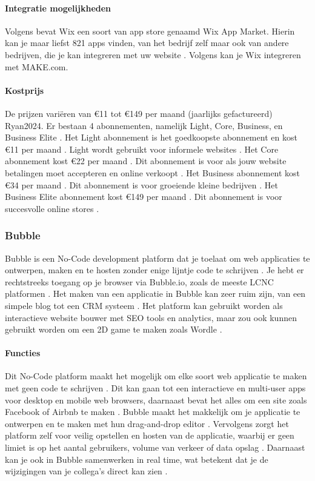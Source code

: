 \paragraph{Integratie mogelijkheden}
Volgens \textcite{Singleton2024} bevat Wix een soort van app store genaamd Wix App Market. 
Hierin kan je maar liefst 821 apps vinden, van het bedrijf zelf maar ook van andere bedrijven, die je kan integreren met uw website \autocite{Singleton2024}.
Volgens \textcite{MAKE.com2024a} kan je Wix integreren met MAKE.com.

\paragraph{Kostprijs}
De prijzen variëren van €11 tot €149 per maand (jaarlijks gefactureerd) \autocite{Wix2024} {Ryan2024}. 
Er bestaan 4 abonnementen, namelijk Light, Core, Business, en Business Elite \autocite{Wix2024}.
Het Light abonnement is het goedkoopste abonnement en kost €11 per maand \autocite{Wix2024}. Light wordt gebruikt voor informele websites \autocite{Ryan2024}.
Het Core abonnement kost €22 per maand \autocite{Wix2024}. Dit abonnement is voor als jouw website betalingen moet accepteren en online verkoopt \autocite{Ryan2024}.
Het Business abonnement kost €34 per maand \autocite{Wix2024}. Dit abonnement is voor groeiende kleine bedrijven \autocite{Ryan2024}.
Het Business Elite abonnement kost €149 per maand \autocite{Wix2024}. Dit abonnement is voor succesvolle online stores \autocite{Ryan2024}.
\subsubsection*{Bubble}
Bubble is een No-Code development platform dat je toelaat om web applicaties te ontwerpen, maken en te hosten zonder enige lijntje code te schrijven \autocite{Sharma2022}.
Je hebt er rechtstreeks toegang op je browser via Bubble.io, zoals de meeste LCNC platformen \autocite{Minor2022}. Het maken van een applicatie in Bubble kan zeer ruim zijn, van een simpele blog tot een CRM systeem \autocite{Sharma2022}.
Het platform kan gebruikt worden als interactieve website bouwer met SEO tools en analytics, maar zou ook kunnen gebruikt worden om een 2D game te maken zoals Wordle \autocite{Minor2022}.

\paragraph{Functies}
Dit No-Code platform maakt het mogelijk om elke soort web applicatie te maken met geen code te schrijven \autocite{Bubble2024b}.
Dit kan gaan tot een interactieve en multi-user apps voor desktop en mobile web browsers, daarnaast bevat het alles om een site zoals Facebook of Airbnb te maken \autocite{Bubble2024b}.
Bubble maakt het makkelijk om je applicatie te ontwerpen en te maken met hun drag-and-drop editor \autocite{Bubble2024b}.
Vervolgens zorgt het platform zelf voor veilig opstellen en hosten van de applicatie, waarbij er geen limiet is op het aantal gebruikers, volume van verkeer of data opslag \autocite{Bubble2024b}.
Daarnaast kan je ook in Bubble samenwerken in real time, wat betekent dat je de wijzigingen van je collega's direct kan zien \autocite{Bubble2024b}.
